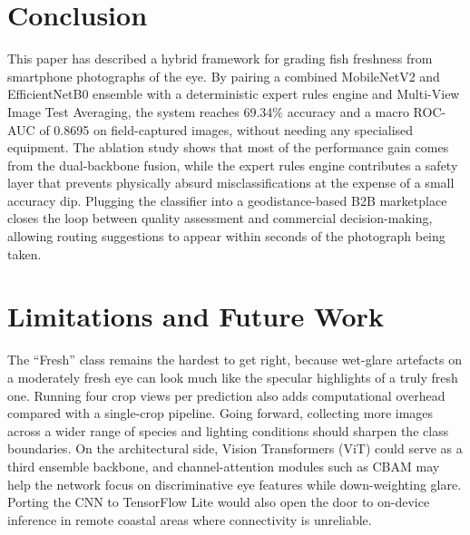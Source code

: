 \documentclass[conference]{IEEEtran}
\begin{document}
\section{Conclusion}
This paper has described a hybrid framework for grading fish freshness from smartphone photographs of the eye. By pairing a combined MobileNetV2 and EfficientNetB0 ensemble with a deterministic expert rules engine and Multi-View Image Test Averaging, the system reaches 69.34\% accuracy and a macro ROC-AUC of 0.8695 on field-captured images, without needing any specialised equipment. The ablation study shows that most of the performance gain comes from the dual-backbone fusion, while the expert rules engine contributes a safety layer that prevents physically absurd misclassifications at the expense of a small accuracy dip. Plugging the classifier into a geodistance-based B2B marketplace closes the loop between quality assessment and commercial decision-making, allowing routing suggestions to appear within seconds of the photograph being taken.

\section{Limitations and Future Work}
The ``Fresh'' class remains the hardest to get right, because wet-glare artefacts on a moderately fresh eye can look much like the specular highlights of a truly fresh one. Running four crop views per prediction also adds computational overhead compared with a single-crop pipeline. Going forward, collecting more images across a wider range of species and lighting conditions should sharpen the class boundaries. On the architectural side, Vision Transformers (ViT) could serve as a third ensemble backbone, and channel-attention modules such as CBAM may help the network focus on discriminative eye features while down-weighting glare. Porting the CNN to TensorFlow Lite would also open the door to on-device inference in remote coastal areas where connectivity is unreliable.
\end{document}
